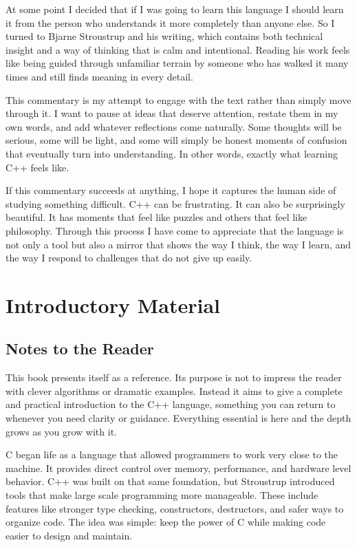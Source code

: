 \documentclass[12pt,letterpaper]{book}
\theoremstyle{definition}
\theoremstyle{remark}
\begin{document}
At some point I decided that if I was going to learn this language I should learn it from the person who understands it more completely than anyone else. So I turned to Bjarne Stroustrup and his writing, which contains both technical insight and a way of thinking that is calm and intentional. Reading his work feels like being guided through unfamiliar terrain by someone who has walked it many times and still finds meaning in every detail.

This commentary is my attempt to engage with the text rather than simply move through it. I want to pause at ideas that deserve attention, restate them in my own words, and add whatever reflections come naturally. Some thoughts will be serious, some will be light, and some will simply be honest moments of confusion that eventually turn into understanding. In other words, exactly what learning C++ feels like.

If this commentary succeeds at anything, I hope it captures the human side of studying something difficult. C++ can be frustrating. It can also be surprisingly beautiful. It has moments that feel like puzzles and others that feel like philosophy. Through this process I have come to appreciate that the language is not only a tool but also a mirror that shows the way I think, the way I learn, and the way I respond to challenges that do not give up easily.

\clearpage

\tableofcontents
\clearpage

\part{Introductory Material}

\chapter{Notes to the Reader}

This book presents itself as a reference. Its purpose is not to impress the reader with clever algorithms or dramatic examples. Instead it aims to give a complete and practical introduction to the C++ language, something you can return to whenever you need clarity or guidance. Everything essential is here and the depth grows as you grow with it.

C began life as a language that allowed programmers to work very close to the machine. It provides direct control over memory, performance, and hardware level behavior. C++ was built on that same foundation, but Stroustrup introduced tools that make large scale programming more manageable. These include features like stronger type checking, constructors, destructors, and safer ways to organize code. The idea was simple: keep the power of C while making code easier to design and maintain.
\end{document}
